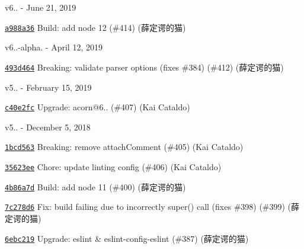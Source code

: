 v6.. -\/ June 21, 2019


\begin{DoxyItemize}
\item \href{https://github.com/eslint/espree/commit/a988a36e436a1ab6c84005ba0adb6cf9c262c1ec}{\texttt{ {\ttfamily a988a36}}} Build\+: add node 12 (\#414) (薛定谔的猫)
\end{DoxyItemize}

v6..-\/alpha. -\/ April 12, 2019


\begin{DoxyItemize}
\item \href{https://github.com/eslint/espree/commit/493d464e1564aea0ea33000389771d42ddece2cb}{\texttt{ {\ttfamily 493d464}}} Breaking\+: validate parser options (fixes \#384) (\#412) (薛定谔的猫)
\end{DoxyItemize}

v5.. -\/ February 15, 2019


\begin{DoxyItemize}
\item \href{https://github.com/eslint/espree/commit/c40e2fcedf81ff06151e82bdf655d2d0d29e71b8}{\texttt{ {\ttfamily c40e2fc}}} Upgrade\+: acorn@6.. (\#407) (Kai Cataldo)
\end{DoxyItemize}

v5.. -\/ December 5, 2018


\begin{DoxyItemize}
\item \href{https://github.com/eslint/espree/commit/1bcd563d4eb4b4032d2662cc5ccd3bfd841b39d7}{\texttt{ {\ttfamily 1bcd563}}} Breaking\+: remove attach\+Comment (\#405) (Kai Cataldo)
\item \href{https://github.com/eslint/espree/commit/35623ee07289c9199eef8b735c97cb3d3d08d5b8}{\texttt{ {\ttfamily 35623ee}}} Chore\+: update linting config (\#406) (Kai Cataldo)
\item \href{https://github.com/eslint/espree/commit/4b86a7dc7c447c11bb6530e46dc43428ce2bd372}{\texttt{ {\ttfamily 4b86a7d}}} Build\+: add node 11 (\#400) (薛定谔的猫)
\item \href{https://github.com/eslint/espree/commit/7c278d6acc6b5db86b803d0cd21b830deb6f569e}{\texttt{ {\ttfamily 7c278d6}}} Fix\+: build failing due to incorrectly super() call (fixes \#398) (\#399) (薛定谔的猫)
\item \href{https://github.com/eslint/espree/commit/6ebc21947166399a0b4918d4a1beb9d610650336}{\texttt{ {\ttfamily 6ebc219}}} Upgrade\+: eslint \& eslint-\/config-\/eslint (\#387) (薛定谔的猫)
\end{DoxyItemize}

